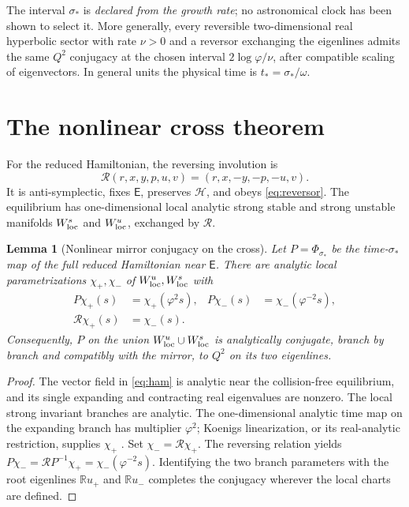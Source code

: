 \documentclass[11pt,letterpaper]{article}
\theoremstyle{paper}
\newtheorem{lemma}{Lemma}
\newcommand{\Flow}{\Phi}
\newcommand{\Rvs}{\mathscr R}
\newcommand{\euler}{\mathsf E}
\begin{document}
The interval $\sigma_*$ is \emph{declared from the growth rate}; no astronomical clock has been shown to select it. More generally, every reversible two-dimensional real hyperbolic sector with rate $\nu>0$ and a reversor exchanging the eigenlines admits the same $Q^2$ conjugacy at the chosen interval $2\log\varphi/\nu$, after compatible scaling of eigenvectors. In general units the physical time is $t_*=\sigma_*/\omega$.

\section{The nonlinear cross theorem}

For the reduced Hamiltonian, the reversing involution is
\begin{equation}
\Rvs(r,x,y,p,u,v)=(r,x,-y,-p,-u,v).
\label{eq:reducedR}
\end{equation}
It is anti-symplectic, fixes $\euler$, preserves $\mathcal H$, and obeys \eqref{eq:reversor}. The equilibrium has one-dimensional local analytic strong stable and strong unstable manifolds $W^s_{\rm loc}$ and $W^u_{\rm loc}$, exchanged by $\Rvs$.

\begin{lemma}[Nonlinear mirror conjugacy on the cross]
Let $P=\Flow_{\sigma_*}$ be the time-$\sigma_*$ map of the full reduced Hamiltonian near $\euler$. There are analytic local parametrizations $\chi_+,\chi_-$ of $W^u_{\rm loc},W^s_{\rm loc}$ with
\begin{equation}
\begin{aligned}
P\chi_+(s)&=\chi_+(\varphi^2s), &
P\chi_-(s)&=\chi_-(\varphi^{-2}s),\\
\Rvs\chi_+(s)&=\chi_-(s).&&
\end{aligned}
\label{eq:cross}
\end{equation}
Consequently, $P$ on the union $W^u_{\rm loc}\cup W^s_{\rm loc}$ is analytically conjugate, branch by branch and compatibly with the mirror, to $Q^2$ on its two eigenlines.
\end{lemma}
\begin{proof}
The vector field in \eqref{eq:ham} is analytic near the collision-free equilibrium, and its single expanding and contracting real eigenvalues are nonzero. The local strong invariant branches are analytic. The one-dimensional analytic time map on the expanding branch has multiplier $\varphi^2$; Koenigs linearization, or its real-analytic restriction, supplies $\chi_+$ \cite{milnor}. Set $\chi_-=\Rvs\chi_+$. The reversing relation yields
$P\chi_-=\Rvs P^{-1}\chi_+=\chi_-(\varphi^{-2}s)$.
Identifying the two branch parameters with the root eigenlines $\mathbb Ru_+$ and $\mathbb Ru_-$ completes the conjugacy wherever the local charts are defined.
\end{proof}
\end{document}
